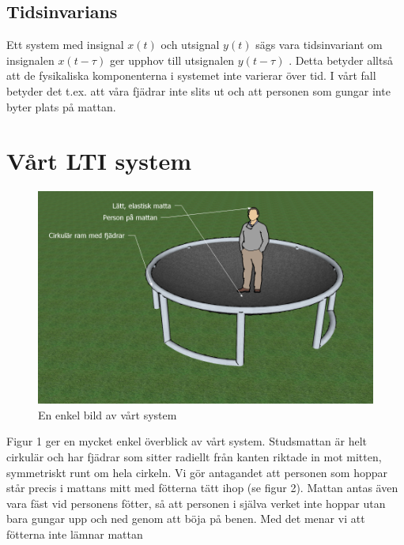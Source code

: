 \documentclass[10pt,a4paper]{article}
\begin{document}

\subsection{Tidsinvarians}

Ett system med insignal $x(t)$ och utsignal $y(t)$ sägs vara tidsinvariant om insignalen $x(t - \tau)$ ger upphov till utsignalen $y(t - \tau)$ \cite[s.~41]{sune2000}. Detta betyder alltså att de fysikaliska komponenterna i systemet inte varierar över tid. I vårt fall betyder det t.ex. att våra fjädrar inte slits ut och att personen som gungar inte byter plats på mattan. 

\newpage
\section{Vårt LTI system}
\begin{figure}[ht]
\begin{center}
\includegraphics[scale=0.62]{Bild2}
\caption{En enkel bild av vårt system}
\end{center}
\end{figure}

Figur 1 ger en mycket enkel överblick av vårt system. Studsmattan är helt cirkulär och har fjädrar som sitter radiellt från kanten riktade in mot mitten, symmetriskt runt om hela cirkeln. Vi gör antagandet att personen som hoppar står precis i mattans mitt med fötterna tätt ihop (se figur 2). Mattan antas även vara fäst vid personens fötter, så att personen i själva verket inte hoppar utan bara gungar upp och ned genom att böja på benen. Med det menar vi att fötterna inte lämnar mattan
\end{document}
